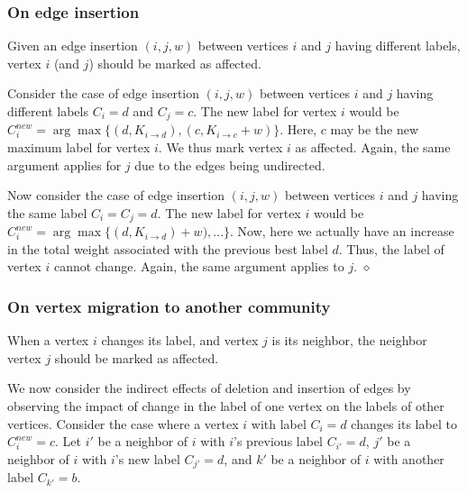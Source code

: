 \subsubsection{On edge insertion}

\begin{lemma}
\label{thm:lpa--mark-insertion}
Given an edge insertion $(i, j, w)$ between vertices $i$ and $j$ having different labels, vertex $i$ (and $j$) should be marked as affected.
\end{lemma}

Consider the case of edge insertion $(i, j, w)$ between vertices $i$ and $j$ having different labels $C_i = d$ and $C_j = c$. The new label for vertex $i$ would be $C_i^{new} = \arg\max \{ (d, K_{i \rightarrow d}), (c, K_{i \rightarrow c} + w) \}$. Here, $c$ may be the new maximum label for vertex $i$. We thus mark vertex $i$ as affected. Again, the same argument applies for $j$ due to the edges being undirected.

Now consider the case of edge insertion $(i, j, w)$ between vertices $i$ and $j$ having the same label $C_i = C_j = d$. The new label for vertex $i$ would be $C_i^{new} = \arg\max \{ (d, K_{i \rightarrow d}) + w), ... \}$. Now, here we actually have an increase in the total weight associated with the previous best label $d$. Thus, the label of vertex $i$ cannot change. Again, the same argument applies to $j$. \hfill $\diamond$




\subsubsection{On vertex migration to another community}

\begin{lemma}
\label{thm:lpa--remark}
When a vertex $i$ changes its label, and vertex $j$ is its neighbor, the neighbor vertex $j$ should be marked as affected.
\end{lemma}

We now consider the indirect effects of deletion and insertion of edges by observing the impact of change in the label of one vertex on the labels of other vertices. Consider the case where a vertex $i$ with label $C_i = d$ changes its label to $C_i^{new} = c$. Let $i'$ be a neighbor of $i$ with $i$'s previous label $C_{i'} = d$, $j'$ be a neighbor of $i$ with $i$'s new label $C_{j'} = d$, and $k'$ be a neighbor of $i$ with another label $C_{k'} = b$.

